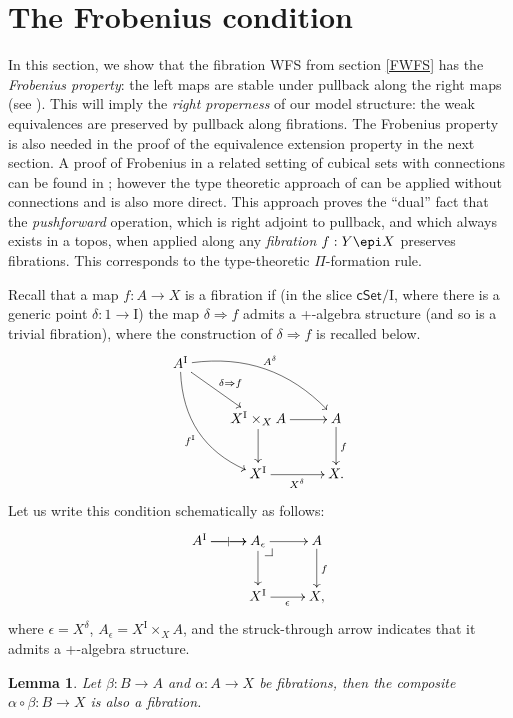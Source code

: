 \documentclass[11pt]{article}
\makeatletter
\newcommand{\cSet}{\ensuremath{\mathsf{cSet}}}
\newcommand{\pbcorner}[1][dr]{\save*!/#1-1.2pc/#1:(-1,1)@^{|-}\restore}
\newcommand{\ra}{\ensuremath{\rightarrow}}
\newcommand{\I}{\ensuremath{\mathrm{I}}}
\newtheorem{lemma}[theorem]{Lemma}
\theoremstyle{remark}
\theoremstyle{definition}
\makeatother
\begin{document}
\section{The Frobenius condition}\label{sec:Frobenius}

In this section, we show that the fibration WFS from section \ref{FWFS} has the \emph{Frobenius property}: the left maps are stable under pullback along the right maps (see \cite{vdBG}).  This will imply the \emph{right properness} of our model structure: the weak equivalences are preserved by pullback along fibrations.  The Frobenius property is also needed in the proof of the equivalence extension property in the next section.  A proof of Frobenius in a related setting of cubical sets with connections can be found in \cite{GS}; however the type theoretic approach of \cite{OP,CCHM} can be applied without connections and is also more direct.  This approach proves the ``dual'' fact that the \emph{pushforward} operation, which is right adjoint to pullback, and which always exists in a topos, when applied along any \emph{fibration} $f : Y\epi X$ preserves fibrations.  This corresponds to the type-theoretic $\Pi$-formation rule.  

Recall that a map $f:A\ra X$ is a fibration if (in the slice $\cSet/\I$, where there is a generic point $\delta : 1 \ra \I$) the map $\delta \Rightarrow f$ admits a +-algebra structure (and so is a trivial fibration), where the construction of $\delta \Rightarrow f$ is recalled below.
\begin{equation}\label{diagram:frobenius1}
\xymatrix{
A^\I \ar@/_4ex/ [rdd]_{f^\I} \ar[rd]^{\delta\Rightarrow{f}} \ar@/^4ex/ [rrd]^{A^{\delta}}  && \\
& X^\I \times_{X} A \ar[d] \ar[r] & A \ar[d]^{f} \\
& X^\I \ar[r]_{X^{\delta}} &  X.
}
\end{equation}
Let us write this condition schematically as follows:
\begin{equation}\label{diagram:frobenius1}
\xymatrix{
A^\I \ar[r]|| \ar[r]  & A_\epsilon\ar[d] \pbcorner \ar[r] & A \ar[d]^f \\
& X^\I \ar[r]_{\epsilon} &  X,
}
\end{equation}
where $\epsilon = X^{\delta}$, $A_\epsilon = X^\I \times_{X} A$, and the struck-through arrow indicates that it admits a +-algebra structure.

\begin{lemma}\label{lemma:fibrationscompose}
Let $\beta: B\ra A$ and $\alpha : A \ra X$ be fibrations, then the composite $\alpha\circ\beta : B \ra X$ is also a fibration.
\end{lemma}
\end{document}
